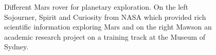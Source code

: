 \begin{description}
\begin{figure}[thpb]
	  \myfloatalign
      \footnotesize
      \centering
   \caption[Mars rover]{Different Mars rover for planetary exploration. On the left Sojourner, Spirit and Curiosity from NASA which provided rich scientific information exploring Mars and on the right Mawson an academic research project on a training track at the Museum of Sydney.}
   \label{fig:fig_rovers}
\end{figure}


\end{description}
